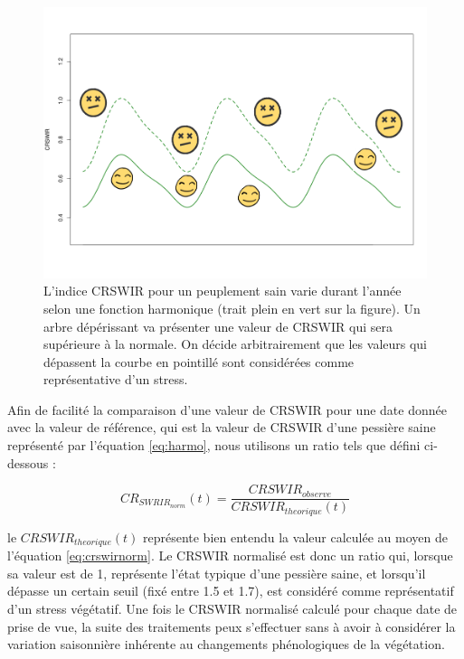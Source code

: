 \documentclass[a4paper, 12pt]{article} %
\begin{document}
\begin{figure}[H]
	\centering
	\includegraphics[width=0.9\linewidth]{fctHarmo.png}
	\caption{L'indice CRSWIR pour un peuplement sain varie durant l'année selon une fonction harmonique (trait plein en vert sur la figure). Un arbre dépérissant va présenter une valeur de CRSWIR qui sera supérieure à la normale. On décide arbitrairement que les valeurs qui dépassent la courbe en pointillé sont considérées comme représentative d'un stress. }
	\label{fig:harmo}
\end{figure}

Afin de facilité la comparaison d'une valeur de CRSWIR pour une date donnée avec la valeur de référence, qui est la valeur de CRSWIR d'une pessière saine représenté par l'équation \ref{eq:harmo}, nous utilisons un ratio tels que défini ci-dessous :

\begin{equation}\label{eq:crswirnorm}
CR_{SWRIR_{norm}}(t)=\dfrac{CRSWIR_{observe}}{CRSWIR_{theorique}(t)}
\end{equation} 

le $CRSWIR_{theorique}(t)$ représente bien entendu la valeur calculée au moyen de l'équation \ref{eq:crswirnorm}. Le CRSWIR normalisé est donc un ratio qui, lorsque sa valeur est de 1, représente l'état typique d'une pessière saine, et lorsqu'il dépasse un certain seuil (fixé entre 1.5 et 1.7), est considéré comme représentatif d'un stress végétatif. Une fois le CRSWIR normalisé calculé pour chaque date de prise de vue, la suite des traitements peux s'effectuer sans à avoir à considérer la variation saisonnière inhérente au changements phénologiques de la végétation.
\end{document}
